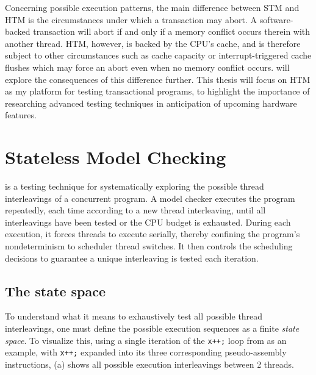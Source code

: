 Concerning possible execution patterns,
the main difference between STM and HTM is the circumstances under which a transaction may abort.
A software-backed transaction will abort if and only if a memory conflict occurs therein with another thread.
HTM, however, is backed by the CPU's cache, and is therefore subject to other circumstances such as cache capacity or interrupt-triggered cache flushes which may force an abort even when no memory conflict occurs.
 will explore the consequences of this difference further.
%
This thesis will focus on HTM as my platform for testing transactional programs,
to highlight the importance of researching advanced testing techniques in anticipation of upcoming hardware features.


\section{Stateless Model Checking}
\label{sec:overview-stateless} %

 is a testing technique for systematically exploring the possible thread interleavings of a concurrent program.
A model checker executes the program repeatedly, each time according to a new thread interleaving, until all interleavings have been tested or the CPU budget is exhausted.
During each execution, it forces threads to execute serially, thereby confining the program's nondeterminism to scheduler thread switches.
It then controls the scheduling decisions
to guarantee a unique interleaving is tested each iteration.

\subsection{The state space}
\label{sec:overview-statespace}

To understand what it means to exhaustively test all possible thread interleavings,
one must define the possible execution sequences as a finite {\em state space}.
To visualize this,
using a single iteration of the {\tt x++;} loop from  as an example,
with {\tt x++;} expanded into its three corresponding pseudo-assembly instructions,
(a) shows all possible execution interleavings
between 2 threads.


